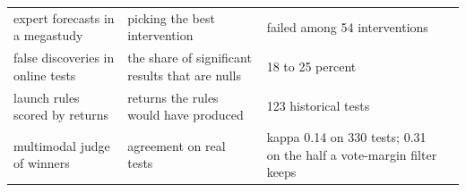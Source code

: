 \begin{table}[t]
\begin{tabular}{p{}p{}p{}l}
expert forecasts in a megastudy & picking the best intervention & failed among 54 interventions & \cite{milkman2021megastudies} \\
false discoveries in online tests & the share of significant results that are nulls & 18 to 25 percent & \cite{berman2022false} \\
launch rules scored by returns & returns the rules would have produced & 123 historical tests & \cite{chou2025evaluating} \\
multimodal judge of winners & agreement on real tests & kappa 0.14 on 330 tests; 0.31 on the half a vote-margin filter keeps & \cite{dooskin2026judge} \\
\bottomrule
\end{tabular}
\end{table}

